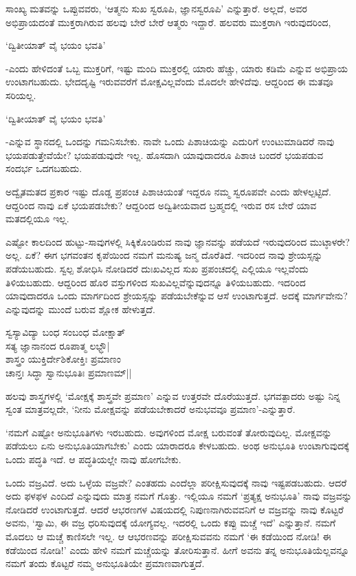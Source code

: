 ಸಾಂಖ್ಯ ಮತವನ್ನು ಒಪ್ಪುವವರು, `ಆತ್ಮನು ಸುಖ ಸ್ವರೂಪಿ, ಜ್ಞಾನಸ್ವರೂಪಿ' ಎನ್ನುತ್ತಾರೆ. ಅಲ್ಲದೆ, ಅವರ ಅಭಿಪ್ರಾಯದಂತೆ ಮುಕ್ತರಾಗಿರುವ ಹಲವು ಬೇರೆ ಬೇರೆ ಆತ್ಮರು ಇದ್ದಾರೆ. ಹಲವರು ಮುಕ್ತರಾಗಿ ಇರುವುದರಿಂದ,

\begin{shloka}
`ದ್ವಿತೀಯಾತ್ ವೈ ಭಯಂ ಭವತಿ'
\end{shloka}

-ಎಂದು ಹೇಳಿದಂತೆ ಒಬ್ಬ ಮುಕ್ತರಿಗೆ, ಇಷ್ಟು ಮಂದಿ ಮುಕ್ತರಲ್ಲಿ ಯಾರು ಹೆಚ್ಚು, ಯಾರು ಕಡಿಮೆ ಎನ್ನುವ ಅಭಿಪ್ರಾಯ ಉಂಟಾಗಬಹುದು. ಭೇದದೃಷ್ಟಿ ಇರುವವರೆಗೆ ಮೋಕ್ಷವಿಲ್ಲವೆಂದು ಮೊದಲೇ ಹೇಳಿದೆವು. ಆದ್ದರಿಂದ ಈ ಮತವೂ ಸರಿಯಲ್ಲ.

\begin{shloka}
`ದ್ವಿತೀಯಾತ್ ವೈ ಭಯಂ ಭವತಿ'
\end{shloka}

-ಎನ್ನುವ ಸ್ಥಾನದಲ್ಲಿ ಒಂದನ್ನು ಗಮನಿಸಬೇಕು. ನಾವೇ ಒಂದು ಪಿಶಾಚಿಯನ್ನು ಎದುರಿಗೆ ಉಂಟುಮಾಡಿದರೆ ನಾವು ಭಯಪಡುತ್ತೇವೆಯೇ? ಭಯಪಡುವುದೇ ಇಲ್ಲ. ಹೊಸದಾಗಿ ಯಾವುದಾದರೂ ಪಿಶಾಚಿ ಬಂದರೆ ಭಯಪಡುವ ಸಂದರ್ಭ ಒದಗಬಹುದು.

ಅದ್ವೈತಮತದ ಪ್ರಕಾರ ಇಷ್ಟು ದೊಡ್ಡ ಪ್ರಪಂಚ ಪಿಶಾಚಿಯಂತೆ ಇದ್ದರೂ ನಮ್ಮ ಸ್ವರೂಪವೇ ಎಂದು ಹೇಳಲ್ಪಟ್ಟಿದೆ. ಆದ್ದರಿಂದ ನಾವು ಏಕೆ ಭಯಪಡಬೇಕು? ಆದ್ದರಿಂದ ಅದ್ವಿತೀಯವಾದ ಬ್ರಹ್ಮದಲ್ಲಿ ಇರುವ ರಸ ಬೇರೆ ಯಾವ ಮತದಲ್ಲಿಯೂ ಇಲ್ಲ.

ಎಷ್ಟೋ ಕಾಲದಿಂದ ಹುಟ್ಟು-ಸಾವುಗಳಲ್ಲಿ ಸಿಕ್ಕಿಕೊಂಡಿರುವ ನಾವು ಜ್ಞಾನವನ್ನು ಪಡೆಯದೆ ಇರುವುದರಿಂದ ಮುಟ್ಠಾಳರೇ? ಅಲ್ಲ. ಏಕೆ? ಈಗ ಭಗವಂತನ ಕೃಪೆಯಿಂದ ನಮಗೆ ಮನುಷ್ಯ ಜನ್ಮ ದೊರೆತಿದೆ. ಇದರಿಂದ ನಾವು ಶ್ರೇಯಸ್ಸನ್ನು ಪಡೆಯಬಹುದು. ಸ್ವಲ್ಪ ಶೋಧಿಸಿ ನೋಡಿದರೆ ದುಃಖವಿಲ್ಲದ ಸುಖ ಪ್ರಪಂಚದಲ್ಲಿ ಎಲ್ಲಿಯೂ ಇಲ್ಲವೆಂದು ತಿಳಿಯಬಹುದು. ಆದ್ದರಿಂದ ಹೊರ ವಸ್ತುಗಳಿಂದ ಸುಖವಿಲ್ಲವೆನ್ನುವುದನ್ನೂ ತಿಳಿಯಬಹುದು. ಇದರಿಂದ ಯಾವುದಾದರೂ ಒಂದು ಮಾರ್ಗದಿಂದ ಶ್ರೇಯಸ್ಸನ್ನು ಪಡೆಯಬೇಕೆನ್ನುವ ಆಸೆ ಉಂಟಾಗುತ್ತದೆ. ಅದಕ್ಕೆ ಮಾರ್ಗವೇನು? ಎನ್ನುವುದನ್ನು ಮುಂದೆ ಬರುವ ಶ್ಲೋಕ ಹೇಳುತ್ತದೆ.

\begin{shloka}
ಸ್ವಸ್ಯಾವಿದ್ಯಾ ಬಂಧ ಸಂಬಂಧ ಮೋಕ್ಷಾತ್\\
ಸತ್ಯ ಜ್ಞಾನಾನಂದ ರೂಪಾತ್ಮ ಲಭ್ಧೌ|\\
ಶಾಸ್ತ್ರಂ ಯುಕ್ತಿರ್ದೇಶಿಕೋಕ್ತಿಃ ಪ್ರಮಾಣಂ\\
ಚಾನ್ತಃ ಸಿದ್ಧಾ ಸ್ವಾನುಭೂತಿಃ ಪ್ರಮಾಣಮ್||
\end{shloka}

ಹಲವು ಶಾಸ್ತ್ರಗಳಲ್ಲಿ `ಮೋಕ್ಷಕ್ಕೆ ಶಾಸ್ತ್ರವೇ ಪ್ರಮಾಣ' ಎನ್ನುವ ಉತ್ತರವೇ ದೊರೆಯುತ್ತದೆ. ಭಗವತ್ಪಾದರು ಅಷ್ಟು ನಿನ್ನ ಸ್ವಂತ ಮಾತ್ರವಲ್ಲದೇ, `ನೀನು ಮೋಕ್ಷವನ್ನು ಪಡೆಯಬೇಕಾದರೆ ಅನುಭವವೂ ಪ್ರಮಾಣ'-ಎನ್ನುತ್ತಾರೆ.

`ನಮಗೆ ಎಷ್ಟೋ ಅನುಭೂತಿಗಳು ಇರಬಹುದು. ಅವುಗಳಿಂದ ಮೋಕ್ಷ ಬರುವಂತೆ ತೋರುವುದಿಲ್ಲ. ಮೋಕ್ಷವನ್ನು ಪಡೆಯಲು ಏನು ಅನುಭೂತಿಯಾಗಬೇಕು' ಎಂದು ಯಾರಾದರೂ ಕೇಳಬಹುದು. ಅಂಥ ಅನುಭೂತಿ ಉಂಟಾಗುವುದಕ್ಕೆ ಒಂದು ಪದ್ಧತಿ ಇದೆ. ಆ ಪದ್ಧತಿಯಲ್ಲೇ ನಾವು ಹೋಗಬೇಕು.

ಒಂದು ವಜ್ರವಿದೆ. ಅದು ಒಳ್ಳೆಯ ವಜ್ರವೇ? ಎಂತಹದು ಎಂದೆಲ್ಲಾ ಪರೀಕ್ಷಿಸುವುದಕ್ಕೆ ನಾವು ಇಷ್ಟಪಡಬಹುದು. ಆದರೆ ಅದು ಫಳಫಳ ಎಂದಿದೆ ಎನ್ನುವುದು ಮಾತ್ರ ನಮಗೆ ಗೊತ್ತು. ಇಲ್ಲಿಯೂ ನಮಗೆ `ಪ್ರತ್ಯಕ್ಷ ಅನುಭೂತಿ' ನಾವು ವಜ್ರವನ್ನು ನೋಡಿದರೆ ಉಂಟಾಗುತ್ತದೆ. ಆದರೆ ಆಭರಣಗಳ ವಿಷಯದಲ್ಲಿ ನಿಪುಣನಾಗಿರುವವನಿಗೆ ಆ ವಜ್ರವನ್ನು ನಾವು ಕೊಟ್ಟರೆ ಅವನು, `ಸ್ವಾಮಿ, ಈ ವಜ್ರ ಧರಿಸುವುದಕ್ಕೆ ಯೋಗ್ಯವಲ್ಲ. ಇದರಲ್ಲಿ ಒಂದು ಕಪ್ಪು ಮಚ್ಚೆ ಇದೆ' ಎನ್ನುತ್ತಾನೆ. ನಮಗೆ ಮೊದಲು ಆ ಮಚ್ಚೆ ಕಾಣಿಸಲೇ ಇಲ್ಲ. ಆ ಆಭರಣವನ್ನು ಪರೀಕ್ಷಿಸುವವನು ನಮಗೆ `ಈ ಕಡೆಯಿಂದ ನೋಡಿ! ಈ ಕಡೆಯಿಂದ ನೋಡಿ!' ಎಂದು ಹೇಳಿ ನಮಗೆ ಮಚ್ಚೆಯನ್ನು ತೋರಿಸುತ್ತಾನೆ. ಹೀಗೆ ಅವನು ತನ್ನ ಅನುಭೂತಿಯೆಲ್ಲವನ್ನೂ ನಮಗೆ ತಂದು ಕೊಟ್ಟರೆ ನಮ್ಮ ಅನುಭೂತಿಯೇ ಪ್ರಮಾಣವಾಗುತ್ತದೆ.

